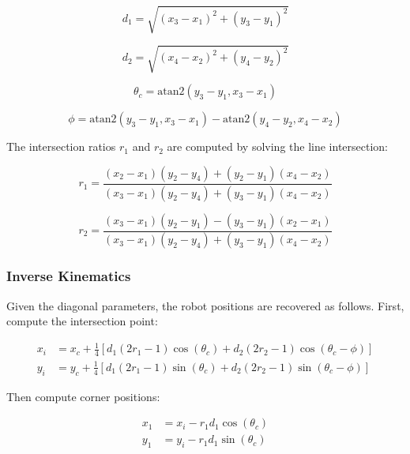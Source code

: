 \documentclass[lettersize,journal]{IEEEtran}
\begin{document}
\begin{equation}
d_1 = \sqrt{(x_3 - x_1)^2 + (y_3 - y_1)^2}
\end{equation}

\begin{equation}
d_2 = \sqrt{(x_4 - x_2)^2 + (y_4 - y_2)^2}
\end{equation}

\begin{equation}
\theta_c = \text{atan2}(y_3 - y_1, x_3 - x_1)
\end{equation}

\begin{equation}
\phi = \text{atan2}(y_3 - y_1, x_3 - x_1) - \text{atan2}(y_4 - y_2, x_4 - x_2)
\end{equation}

The intersection ratios $r_1$ and $r_2$ are computed by solving the line intersection:

\begin{equation}
r_1 = \frac{(x_2 - x_1)(y_2 - y_4) + (y_2 - y_1)(x_4 - x_2)}{(x_3 - x_1)(y_2 - y_4) + (y_3 - y_1)(x_4 - x_2)}
\end{equation}

\begin{equation}
r_2 = \frac{(x_3 - x_1)(y_2 - y_1) - (y_3 - y_1)(x_2 - x_1)}{(x_3 - x_1)(y_2 - y_4) + (y_3 - y_1)(x_4 - x_2)}
\end{equation}

\subsubsection{Inverse Kinematics}

Given the diagonal parameters, the robot positions are recovered as follows. First, compute the intersection point:

\begin{equation}
\begin{aligned}
x_i &= x_c + \frac{1}{4}\left[d_1(2r_1 - 1)\cos(\theta_c) + d_2(2r_2 - 1)\cos(\theta_c - \phi)\right] \\
y_i &= y_c + \frac{1}{4}\left[d_1(2r_1 - 1)\sin(\theta_c) + d_2(2r_2 - 1)\sin(\theta_c - \phi)\right]
\end{aligned}
\end{equation}

Then compute corner positions:

\begin{equation}
\begin{aligned}
x_1 &= x_i - r_1 d_1 \cos(\theta_c) \\
y_1 &= y_i - r_1 d_1 \sin(\theta_c)
\end{aligned}
\end{equation}
\end{document}
